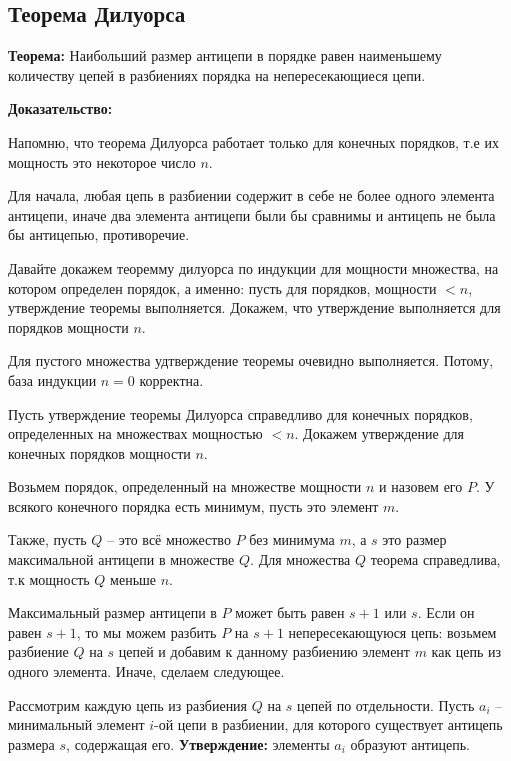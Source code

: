 \subsection{Теорема Дилуорса}

\textbf{Теорема:} Наибольший размер антицепи в порядке равен наименьшему количеству цепей в разбиениях порядка на непересекающиеся цепи.

\textbf{Доказательство:} 

\hspace{0.5cm}\parbox{17cm} {
    Напомню, что теорема Дилуорса работает только для конечных порядков, т.е их мощность это некоторое число $n$. 

    Для начала, любая цепь в разбиении содержит в себе не более одного элемента антицепи, иначе два элемента антицепи были бы сравнимы и антицепь не была бы антицепью, противоречие.

    Давайте докажем теоремму дилуорса по индукции для мощности множества, на котором определен порядок, а именно: пусть для порядков, мощности $< n$, утверждение теоремы выполняется. Докажем, что утверждение выполняется для порядков мощности $n$.

    Для пустого множества удтверждение теоремы очевидно выполняется. Потому, база индукции $n = 0$ корректна.

    Пусть утверждение теоремы Дилуорса справедливо для конечных порядков, определенных на множествах мощностью $< n$. Докажем утверждение для конечных порядков мощности $n$.

    Возьмем порядок, определенный на множестве мощности $n$ и назовем его $P$. У всякого конечного порядка есть минимум, пусть это элемент $m$.

    Также, пусть $Q$ -- это всё множество $P$ без минимума $m$, а $s$ это размер максимальной антицепи в множестве $Q$. Для множества $Q$ теорема справедлива, т.к мощность $Q$ меньше $n$.

    Максимальный размер антицепи в $P$ может быть равен $s + 1$ или $s$. Если он равен $s + 1$, то мы можем разбить $P$ на $s + 1$ непересекающуюся цепь: возьмем разбиение $Q$ на $s$ цепей и добавим к данному разбиению элемент $m$ как цепь из одного элемента. Иначе, сделаем следующее.

    Рассмотрим каждую цепь из разбиения $Q$ на $s$ цепей по отдельности. Пусть $a_i$ -- минимальный элемент $i$-ой цепи в разбиении, для которого существует антицепь размера $s$, содержащая его. \textbf{Утверждение:} элементы $a_i$ образуют антицепь.

}

